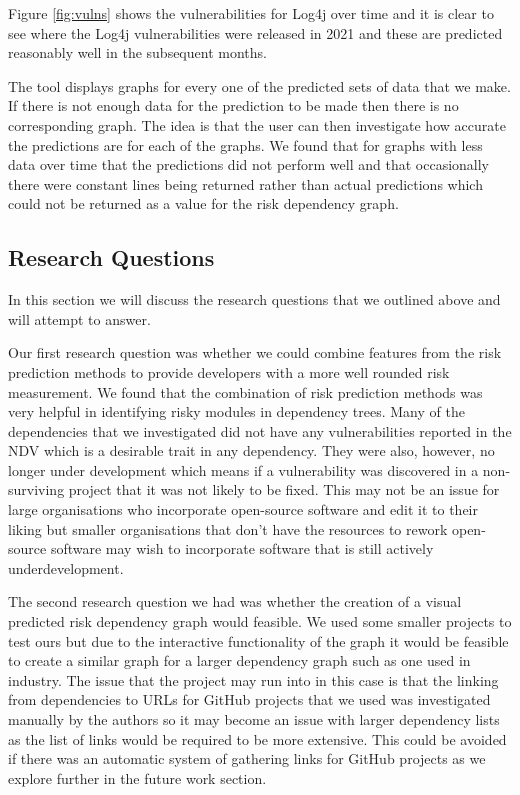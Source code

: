\documentclass[conference]{IEEEtran}
\begin{document}
Figure \ref{fig:vulns} shows the vulnerabilities for Log4j over time and it is clear to see where the Log4j vulnerabilities were released in 2021 and these are predicted reasonably well in the subsequent months. 

The tool displays graphs for every one of the predicted sets of data that we make. If there is not enough data for the prediction to be made then there is no corresponding graph. The idea is that the user can then investigate how accurate the predictions are for each of the graphs. We found that for graphs with less data over time that the predictions did not perform well and that occasionally there were constant lines being returned rather than actual predictions which could not be returned as a value for the risk dependency graph. 

\subsection{Research Questions}
In this section we will discuss the research questions that we outlined above and will attempt to answer. 

Our first research question was whether we could combine features from the risk prediction methods to provide developers with a more well rounded risk measurement. We found that the combination of risk prediction methods was very helpful in identifying risky modules in dependency trees. Many of the dependencies that we investigated did not have any vulnerabilities reported in the NDV which is a desirable trait in any dependency. They were also, however, no longer under development which means if a vulnerability was discovered in a non-surviving project that it was not likely to be fixed. This may not be an issue for large organisations who incorporate open-source software and edit it to their liking but smaller organisations that don't have the resources to rework open-source software may wish to incorporate software that is still actively underdevelopment.

The second research question we had was whether the creation of a visual predicted risk dependency graph would feasible. We used some smaller projects to test ours but due to the interactive functionality of the graph it would be feasible to create a similar graph for a larger dependency graph such as one used in industry. The issue that the project may run into in this case is that the linking from dependencies to URLs for GitHub projects that we used was investigated manually by the authors so it may become an issue with larger dependency lists as the list of links would be required to be more extensive. This could be avoided if there was an automatic system of gathering links for GitHub projects as we explore further in the future work section. 
\end{document}
